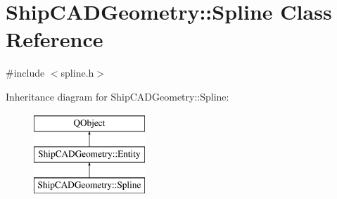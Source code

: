\hypertarget{classShipCADGeometry_1_1Spline}{\section{Ship\-C\-A\-D\-Geometry\-:\-:Spline Class Reference}
\label{classShipCADGeometry_1_1Spline}
}


{\ttfamily \#include $<$spline.\-h$>$}

Inheritance diagram for Ship\-C\-A\-D\-Geometry\-:\-:Spline\-:\begin{figure}[H]
\begin{center}
\leavevmode
\includegraphics[height=3.000000cm]{classShipCADGeometry_1_1Spline}
\end{center}
\end{figure}
